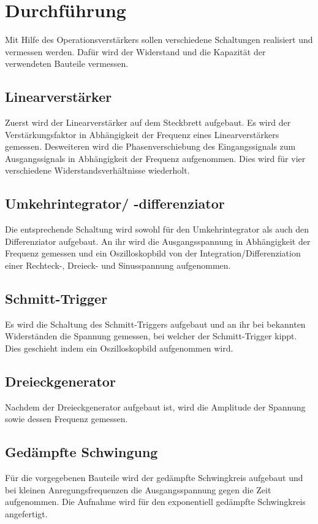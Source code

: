 \section{Durchführung}%
\label{sec:durchführung}
Mit Hilfe des Operationsverstärkers sollen verschiedene Schaltungen
realisiert und vermessen werden.
Dafür wird der Widerstand und die Kapazität der verwendeten Bauteile
vermessen.

\subsection{Linearverstärker}%
\label{sub:linearverstaerker}
Zuerst wird der Linearverstärker auf dem Steckbrett aufgebaut.
Es wird der Verstärkungsfaktor in Abhängigkeit der Frequenz eines
Linearverstärkers gemessen.
Desweiteren wird die Phasenverschiebung des Eingangssignals zum Ausgangssignals
in Abhängigkeit der Frequenz aufgenommen.
Dies wird für vier verschiedene Widerstandsverhältnisse wiederholt.

\subsection{Umkehrintegrator/ -differenziator}%
\label{sub:umkehrintegrator_differenziator}
Die entsprechende Schaltung wird sowohl für den Umkehrintegrator als auch den
Differenziator aufgebaut.
An ihr wird die Ausgangsspannung in Abhängigkeit der Frequenz gemessen und ein
Oszilloskopbild von der Integration/Differenziation einer Rechteck-, Dreieck-
und Sinusspannung aufgenommen.

\subsection{Schmitt-Trigger}%
\label{sub:schmitt_trigger}
Es wird die Schaltung des Schmitt-Triggers aufgebaut und an ihr bei bekannten
Widerständen die Spannung gemessen, bei welcher der Schmitt-Trigger kippt.
Dies geschieht indem ein Oszilloskopbild aufgenommen wird.

\subsection{Dreieckgenerator}%
\label{sub:dreieckgenerator}
Nachdem der Dreieckgenerator aufgebaut ist,
wird die Amplitude der Spannung sowie dessen Frequenz gemessen.

\subsection{Gedämpfte Schwingung}%
\label{sub:gedaempfte_schwingung}
Für die vorgegebenen Bauteile wird der gedämpfte Schwingkreis aufgebaut und
bei kleinen Anregungsfrequenzen die Ausgangsspannung gegen die Zeit
aufgenommen.
Die Aufnahme wird für den exponentiell gedämpfte
Schwingkreis angefertigt.
